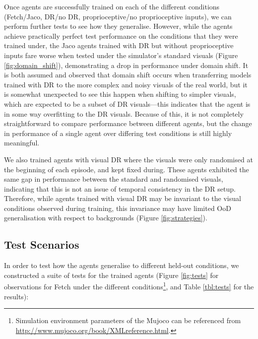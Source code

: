 Once agents are successfully trained on each of the different conditions
(Fetch/Jaco, DR/no DR, proprioceptive/no proprioceptive inputs), we can
perform further tests to see how they generalise. However, while the
agents achieve practically perfect test performance on the conditions
that they were trained under, the Jaco agents trained with DR but
without proprioceptive inputs fare worse when tested under the
simulator's standard visuals (Figure \ref{fig:domain_shift}),
demonstrating a drop in performance under domain shift. It is both
assumed and observed that domain shift occurs when transferring models
trained with DR to the more complex and noisy visuals of the real world,
but it is somewhat unexpected to see this happen when shifting to
simpler visuals, which are expected to be a subset of DR visuals---this
indicates that the agent is in some way overfitting to the DR visuals.
Because of this, it is not completely straightforward to compare
performance between different agents, but the change in performance of a
single agent over differing test conditions is still highly meaningful.

We also trained agents with visual DR where the visuals were only
randomised at the beginning of each episode, and kept fixed during.
These agents exhibited the same gap in performance between the standard
and randomised visuals, indicating that this is not an issue of temporal
consistency in the DR setup. Therefore, while agents trained with visual
DR may be invariant to the visual conditions observed during training,
this invariance may have limited OoD generalisation with respect to
backgrounds (Figure \ref{fig:strategies}).

\hypertarget{test-scenarios}{%
\subsection{Test Scenarios}\label{test-scenarios}}

\label{sec:test_scenarios}

In order to test how the agents generalise to different held-out
conditions, we constructed a suite of tests for the trained agents
(Figure \ref{fig:tests} for observations for Fetch under the different
conditions\footnote{Simulation environment parameters of the Mujoco can
  be referenced from \url{http://www.mujoco.org/book/XMLreference.html}.},
and Table \ref{tbl:tests} for the results):


